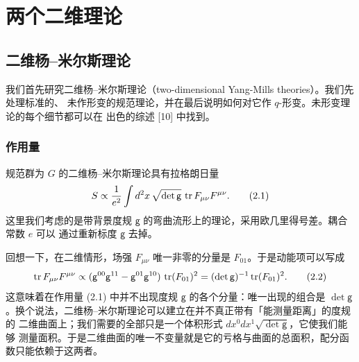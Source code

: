 
\section{两个二维理论}

\subsection{二维杨--米尔斯理论}

我们首先研究二维杨--米尔斯理论（two-dimensional Yang-Mills theories）。我们先处理标准的、
未作形变的规范理论，并在最后说明如何对它作 $q$-形变。未形变理论的每个细节都可以在
出色的综述 [10] 中找到。

\subsubsection{作用量}

规范群为 $G$ 的二维杨--米尔斯理论具有拉格朗日量
\begin{equation}
  S \propto \frac{1}{e^2}\int d^2x\,\sqrt{\det\mathsf{g}}\,\operatorname{tr} F_{\mu\nu}F^{\mu\nu}.
  \tag{2.1}
\end{equation}
这里我们考虑的是带背景度规 $\mathsf{g}$ 的弯曲流形上的理论，采用欧几里得号差。耦合常数 $e$ 可以
通过重新标度 $\mathsf{g}$ 去掉。

回想一下，在二维情形，场强 $F_{\mu\nu}$ 唯一非零的分量是 $F_{01}$。于是动能项可以写成
\begin{equation}
  \operatorname{tr} F_{\mu\nu}F^{\mu\nu}
  \propto (\mathsf{g}^{00}\mathsf{g}^{11}-\mathsf{g}^{01}\mathsf{g}^{10})\,\operatorname{tr}(F_{01})^2
  = (\det\mathsf{g})^{-1}\operatorname{tr}(F_{01})^2 .
  \tag{2.2}
\end{equation}
这意味着在作用量 (2.1) 中并不出现度规 $\mathsf{g}$ 的各个分量：唯一出现的组合是
$\det\mathsf{g}$。换个说法，二维杨--米尔斯理论可以建立在并不真正带有「能测量距离」的度规的
二维曲面上；我们需要的全部只是一个体积形式 $dx^0dx^1\sqrt{\det\mathsf{g}}$，它使我们能够
测量面积。于是二维曲面的唯一不变量就是它的亏格与曲面的总面积，配分函数只能依赖于这两者。

